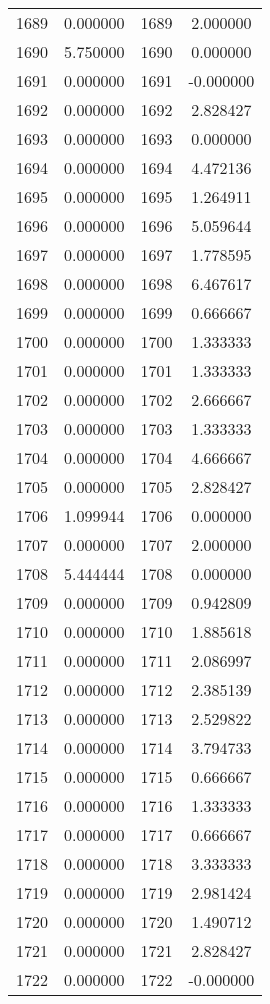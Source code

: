 \documentclass[12pt]{article}
\begin{document}
\begin{longtable}{@{}cccc@{}}
1689 & 0.000000 & 1689 & 2.000000 \\
1690 & 5.750000 & 1690 & 0.000000 \\
1691 & 0.000000 & 1691 & -0.000000 \\
1692 & 0.000000 & 1692 & 2.828427 \\
1693 & 0.000000 & 1693 & 0.000000 \\
1694 & 0.000000 & 1694 & 4.472136 \\
1695 & 0.000000 & 1695 & 1.264911 \\
1696 & 0.000000 & 1696 & 5.059644 \\
1697 & 0.000000 & 1697 & 1.778595 \\
1698 & 0.000000 & 1698 & 6.467617 \\
1699 & 0.000000 & 1699 & 0.666667 \\
1700 & 0.000000 & 1700 & 1.333333 \\
1701 & 0.000000 & 1701 & 1.333333 \\
1702 & 0.000000 & 1702 & 2.666667 \\
1703 & 0.000000 & 1703 & 1.333333 \\
1704 & 0.000000 & 1704 & 4.666667 \\
1705 & 0.000000 & 1705 & 2.828427 \\
1706 & 1.099944 & 1706 & 0.000000 \\
1707 & 0.000000 & 1707 & 2.000000 \\
1708 & 5.444444 & 1708 & 0.000000 \\
1709 & 0.000000 & 1709 & 0.942809 \\
1710 & 0.000000 & 1710 & 1.885618 \\
1711 & 0.000000 & 1711 & 2.086997 \\
1712 & 0.000000 & 1712 & 2.385139 \\
1713 & 0.000000 & 1713 & 2.529822 \\
1714 & 0.000000 & 1714 & 3.794733 \\
1715 & 0.000000 & 1715 & 0.666667 \\
1716 & 0.000000 & 1716 & 1.333333 \\
1717 & 0.000000 & 1717 & 0.666667 \\
1718 & 0.000000 & 1718 & 3.333333 \\
1719 & 0.000000 & 1719 & 2.981424 \\
1720 & 0.000000 & 1720 & 1.490712 \\
1721 & 0.000000 & 1721 & 2.828427 \\
1722 & 0.000000 & 1722 & -0.000000 \\

\end{longtable}
\end{document}
